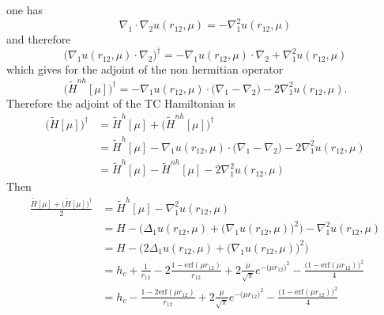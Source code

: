 \documentclass[aip,jcp,reprint,noshowkeys,superscriptaddress]{revtex4-1}
\begin{document}
one has
\begin{equation}
 \nabla_1 \cdot \nabla_2 u(r_{12},\mu) = - \nabla_1^2 u(r_{12},\mu)
\end{equation}
and therefore 
\begin{equation}
 \bigg( \nabla_{1}u(r_{12},\mu) \cdot \nabla_2 \bigg)^\dagger = - \nabla_{1}u(r_{12},\mu) \cdot \nabla_2 
                                                                + \nabla_1^2 u(r_{12},\mu)
\end{equation}
which gives for the adjoint of the non hermitian operator 
\begin{equation}
 \bigg( \tilde{H}^{nh}[\mu]\bigg)^\dagger = - \nabla_{1}u(r_{12},\mu) \cdot \big( \nabla_1 -\nabla_2 \big) - 2 \nabla_1^2 u(r_{12},\mu).
\end{equation}
Therefore the adjoint of the TC Hamiltonian is
\begin{equation}
 \begin{aligned}
\bigg(\tilde{H}[\mu]\bigg)^\dagger & = \tilde{H}^h[\mu] + \bigg( \tilde{H}^{nh}[\mu] \bigg)^\dagger \\
                                   & = \tilde{H}^h[\mu]  - \nabla_{1}u(r_{12},\mu) \cdot \big( \nabla_1 -\nabla_2 \big) - 2 \nabla_1^2 u(r_{12},\mu)  \\
                                   & = \tilde{H}^h[\mu]  - \tilde{H}^{nh}[\mu] - 2 \nabla_1^2 u(r_{12},\mu) 
 \end{aligned}
\end{equation}
Then 
\begin{equation}
 \begin{aligned}
 \frac{\tilde{H}[\mu] + \bigg(\tilde{H}[\mu]\bigg)^\dagger}{2}& = \tilde{H}^h[\mu] - \nabla_1^2 u(r_{12},\mu) \\
                                                              & = H - \bigg( \Delta_1 u(r_{12},\mu) + \big( \nabla_1 u(r_{12},\mu)\big)^2\bigg) - \nabla_1^2 u(r_{12},\mu) \\
                                                              & = H - \bigg( 2 \Delta_1 u(r_{12},\mu) + \big( \nabla_1 u(r_{12},\mu)\big)^2\bigg) \\
                                                              & = h_c + \frac{1}{r_{12}} - 2 \frac{1 - \text{erf}(\mu r_{12})}{r_{12}} + 2 \frac{\mu}{\sqrt{\pi}} e^{-\big(\mu r_{12} \big)^2} 
                                                                 - \frac{\bigg(1 - \text{erf}(\mu r_{12})\bigg)^2}{4} \\
                                                              & = h_c - \frac{1 - 2 \text{erf}(\mu r_{12})}{r_{12}} + 2 \frac{\mu}{\sqrt{\pi}} e^{-\big(\mu r_{12} \big)^2}  - \frac{\bigg(1 - \text{erf}(\mu r_{12})\bigg)^2}{4}
 \end{aligned}
\end{equation}
\end{document}
